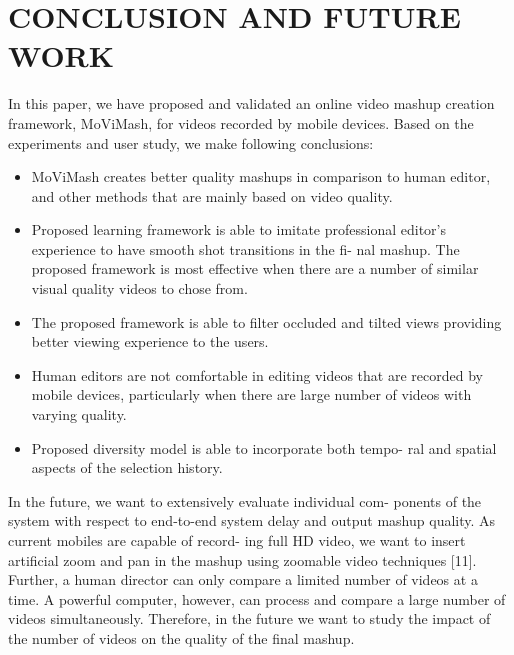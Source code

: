 \documentclass{sig-alternate}
\begin{document}
\section{CONCLUSION AND FUTURE WORK}
In this paper, we have proposed and validated an online video
mashup creation framework, MoViMash, for videos recorded by
mobile devices. Based on the experiments and user study, we make
following conclusions:
\begin{itemize}
  \item MoViMash creates better quality mashups in comparison to
human editor, and other methods that are mainly based on
video quality.
  \item Proposed learning framework is able to imitate professional
editor’s experience to have smooth shot transitions in the fi-
nal mashup. The proposed framework is most effective when there are a number of similar visual quality videos to chose
from.
  \item The proposed framework is able to filter occluded and tilted
views providing better viewing experience to the users.
  \item Human editors are not comfortable in editing videos that are
recorded by mobile devices, particularly when there are large
number of videos with varying quality.
  \item Proposed diversity model is able to incorporate both tempo-
ral and spatial aspects of the selection history.
\end{itemize}

\par In the future, we want to extensively evaluate individual com-
ponents of the system with respect to end-to-end system delay and
output mashup quality. As current mobiles are capable of record-
ing full HD video, we want to insert artificial zoom and pan in the
mashup using zoomable video techniques [11]. Further, a human
director can only compare a limited number of videos at a time.
A powerful computer, however, can process and compare a large
number of videos simultaneously. Therefore, in the future we want
to study the impact of the number of videos on the quality of the
final mashup.
\end{document}
